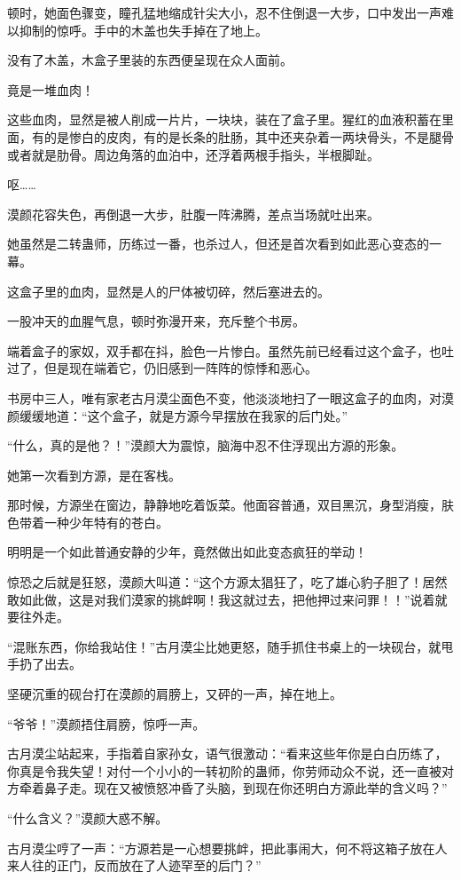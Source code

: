 \begin{this_body}
顿时，她面色骤变，瞳孔猛地缩成针尖大小，忍不住倒退一大步，口中发出一声难以抑制的惊呼。手中的木盖也失手掉在了地上。

没有了木盖，木盒子里装的东西便呈现在众人面前。

竟是一堆血肉！

这些血肉，显然是被人削成一片片，一块块，装在了盒子里。猩红的血液积蓄在里面，有的是惨白的皮肉，有的是长条的肚肠，其中还夹杂着一两块骨头，不是腿骨或者就是肋骨。周边角落的血泊中，还浮着两根手指头，半根脚趾。

呕……

漠颜花容失色，再倒退一大步，肚腹一阵沸腾，差点当场就吐出来。

她虽然是二转蛊师，历练过一番，也杀过人，但还是首次看到如此恶心变态的一幕。

这盒子里的血肉，显然是人的尸体被切碎，然后塞进去的。

一股冲天的血腥气息，顿时弥漫开来，充斥整个书房。

端着盒子的家奴，双手都在抖，脸色一片惨白。虽然先前已经看过这个盒子，也吐过了，但是现在端着它，仍旧感到一阵阵的惊悸和恶心。

书房中三人，唯有家老古月漠尘面色不变，他淡淡地扫了一眼这盒子的血肉，对漠颜缓缓地道：“这个盒子，就是方源今早摆放在我家的后门处。”

“什么，真的是他？！”漠颜大为震惊，脑海中忍不住浮现出方源的形象。

她第一次看到方源，是在客栈。

那时候，方源坐在窗边，静静地吃着饭菜。他面容普通，双目黑沉，身型消瘦，肤色带着一种少年特有的苍白。

明明是一个如此普通安静的少年，竟然做出如此变态疯狂的举动！

惊恐之后就是狂怒，漠颜大叫道：“这个方源太猖狂了，吃了雄心豹子胆了！居然敢如此做，这是对我们漠家的挑衅啊！我这就过去，把他押过来问罪！！”说着就要往外走。

“混账东西，你给我站住！”古月漠尘比她更怒，随手抓住书桌上的一块砚台，就甩手扔了出去。

坚硬沉重的砚台打在漠颜的肩膀上，又砰的一声，掉在地上。

“爷爷！”漠颜捂住肩膀，惊呼一声。

古月漠尘站起来，手指着自家孙女，语气很激动：“看来这些年你是白白历练了，你真是令我失望！对付一个小小的一转初阶的蛊师，你劳师动众不说，还一直被对方牵着鼻子走。现在又被愤怒冲昏了头脑，到现在你还明白方源此举的含义吗？”

“什么含义？”漠颜大惑不解。

古月漠尘哼了一声：“方源若是一心想要挑衅，把此事闹大，何不将这箱子放在人来人往的正门，反而放在了人迹罕至的后门？”


\end{this_body}
